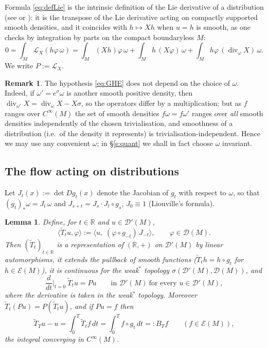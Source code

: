 \documentclass[11pt]{amsart}
\theoremstyle{plain}
\newtheorem{lemma}[theorem]{Lemma}
\theoremstyle{definition}
\newtheorem{remark}[theorem]{Remark}
\theoremstyle{remark}
\newcommand{\D}{\mathcal{D}}
\newcommand{\DD}{\mathcal{D}'}
\newcommand{\EE}{\mathcal{E}}
\newcommand{\Lie}{\mathcal{L}}
\begin{document}
Formula \eqref{eq:defLie} is the intrinsic definition of the Lie
derivative of a distribution (see \cite[Ch.~I, \S3.1,
(3.1.10)]{CHV} or \cite[\S6.1]{Hor1}): it is the transpose of the Lie
derivative acting on compactly supported smooth densities, and it
coincides with $h\mapsto Xh$ when $u=h$ is smooth, as one checks by
integration by parts on the compact boundaryless $M$:
\[
0=\int_M \Lie_X(h\varphi\,\omega)
 =\int_M (Xh)\varphi\,\omega+\int_M h\,(X\varphi)\,\omega
   +\int_M h\varphi\,(\operatorname{div}_\omega X)\,\omega .
\]
We write $P:=\Lie_X$.

\begin{remark}\label{r:intrinsic}
The hypothesis \eqref{eq:GHE} does not depend on the choice of
$\omega$.  Indeed, if $\omega'=e^\sigma\omega$ is another smooth
positive density, then $\operatorname{div}_{\omega'}X
=\operatorname{div}_\omega X-X\sigma$, so the operators differ by a
multiplication; but as $f$ ranges over $C^\infty(M)$ the set of smooth
densities $f\omega=f\omega'$ ranges over \emph{all} smooth densities
independently of the chosen trivialisation, and smoothness of a
distribution (i.e.\ of the density it represents) is
trivialisation-independent.  Hence we may use any convenient $\omega$;
in \S\ref{s:quant} we shall in fact choose $\omega$ invariant.
\end{remark}

\subsection{The flow acting on distributions}

Let $J_t(x):=\det Dg_t(x)$ denote the Jacobian of $g_t$ with respect
to $\omega$, so that $(g_t)_*\omega=J_t\,\omega$ and
$J_{s+t}=J_s\cdot J_t\circ g_s$, $J_0\equiv1$ (Liouville's formula).

\begin{lemma}\label{l:flowact}
Define, for $t\in\mathbb{R}$ and $u\in\DD(M)$,
\begin{equation}\label{eq:Tt}
\langle \widetilde T_t u,\varphi\rangle
:=\bigl\langle u,\;(\varphi\circ g_{-t})\,J_{-t}\bigr\rangle ,
\qquad \varphi\in\D(M).
\end{equation}
Then $(\widetilde T_t)_{t\in\mathbb{R}}$ is a representation of
$(\mathbb{R},+)$ on $\DD(M)$ by linear automorphisms, it extends the
pullback of smooth functions ($\widetilde T_t h=h\circ g_t$ for
$h\in\EE(M)$), it is continuous for the weak$^{\!*}$ topology
$\sigma(\DD(M),\D(M))$, and
\begin{equation}\label{eq:gen}
\frac{d}{dt}\Big|_{t=0}\ \widetilde T_t u = P u
\qquad\text{in } \DD(M)\ \text{for every }u\in\DD(M),
\end{equation}
where the derivative is taken in the weak$^{\!*}$ topology.
Moreover $\widetilde T_t(Pu)=P(\widetilde T_tu)$, and if $Pu=f$ then
\begin{equation}\label{eq:cocycle}
\widetilde T_T u-u=\int_0^{T}\widetilde T_t f\,dt
=\int_0^{T} f\circ g_t\,dt=:B_T f\qquad (f\in\EE(M)),
\end{equation}
the integral converging in $C^\infty(M)$.
\end{lemma}
\end{document}
